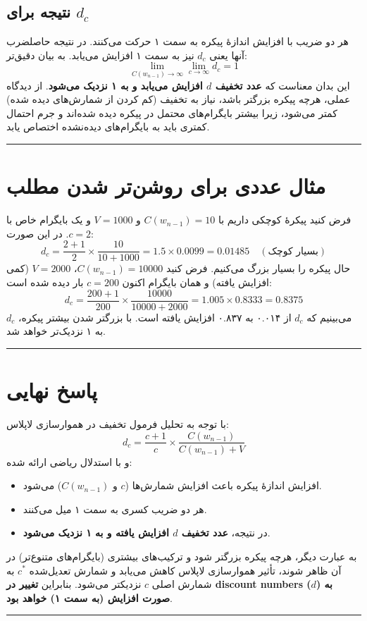 \documentclass[11pt,a4paper]{article}
\newcommand{\en}[1]{\textenglish{#1}}
\newcommand{\separator}{\vspace{1em}\noindent\rule{\linewidth}{0.4pt}\vspace{1em}}
\newcommand{\thickseparator}{\vspace{1em}\noindent\rule{\linewidth}{1pt}\vspace{1em}}
\begin{document}
\subsection*{نتیجه برای \(d_c\)}
هر دو ضریب با افزایش اندازهٔ پیکره به سمت ۱ حرکت می‌کنند. در نتیجه حاصلضرب آنها یعنی \(d_c\) نیز به سمت ۱ افزایش می‌یابد. به بیان دقیق‌تر:
\[
\lim_{C(w_{n-1}) \to \infty} \lim_{c \to \infty} d_c = 1
\]
این بدان معناست که \textbf{عدد تخفیف \(d\) افزایش می‌یابد و به ۱ نزدیک می‌شود}. از دیدگاه عملی، هرچه پیکره بزرگتر باشد، نیاز به تخفیف (کم کردن از شمارش‌های دیده شده) کمتر می‌شود، زیرا بیشتر بایگرام‌های محتمل در پیکره دیده شده‌اند و جرم احتمال کمتری باید به بایگرام‌های دیده‌نشده اختصاص یابد.

\separator
\section{مثال عددی برای روشن‌تر شدن مطلب}
فرض کنید پیکرهٔ کوچکی داریم با \(C(w_{n-1})=10\) و \(V=1000\) و یک بایگرام خاص با \(c=2\). در این صورت:
\[
d_c = \frac{2+1}{2} \times \frac{10}{10+1000} = 1.5 \times 0.0099 = 0.01485 \quad (\text{بسیار کوچک})
\]
حال پیکره را بسیار بزرگ می‌کنیم. فرض کنید \(C(w_{n-1})=10000\)، \(V=2000\) (کمی افزایش یافته) و همان بایگرام اکنون \(c=200\) بار دیده شده است:
\[
d_c = \frac{200+1}{200} \times \frac{10000}{10000+2000} = 1.005 \times 0.8333 = 0.8375
\]
می‌بینیم که \(d_c\) از \en{۰.۰۱۴} به \en{۰.۸۳۷} افزایش یافته است. با بزرگتر شدن بیشتر پیکره، \(d_c\) به ۱ نزدیک‌تر خواهد شد.

\separator
\section{پاسخ نهایی}
با توجه به تحلیل فرمول تخفیف در هموارسازی لاپلاس:
\[
d_c = \frac{c+1}{c} \times \frac{C(w_{n-1})}{C(w_{n-1}) + V}
\]
و با استدلال ریاضی ارائه شده:
\begin{itemize}
\item افزایش اندازهٔ پیکره باعث افزایش شمارش‌ها (\(c\) و \(C(w_{n-1})\)) می‌شود.
\item هر دو ضریب کسری به سمت ۱ میل می‌کنند.
\item در نتیجه، \textbf{عدد تخفیف \(d\) افزایش یافته و به ۱ نزدیک می‌شود}.
\end{itemize}
به عبارت دیگر، هرچه پیکره بزرگتر شود و ترکیب‌های بیشتری (بایگرام‌های متنوع‌تر) در آن ظاهر شوند، تأثیر هموارسازی لاپلاس کاهش می‌یابد و شمارش تعدیل‌شده \(c^*\) به شمارش اصلی \(c\) نزدیکتر می‌شود. بنابراین \textbf{تغییر در \en{discount numbers (\(d\))} به صورت افزایش (به سمت ۱) خواهد بود}.

\thickseparator
\end{document}
